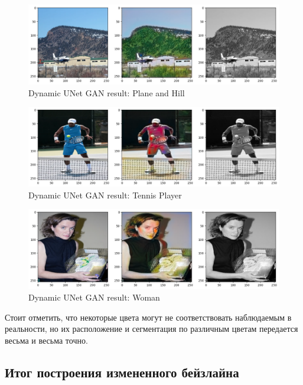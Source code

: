 \documentclass[14pt]{article}
\begin{document}
\begin{figure}[H]
    \centering
    \includegraphics[width=1.0\textwidth]{resources/dynamic_unet_gan_results/plane_and_hill.png}
    \caption{Dynamic UNet GAN result: Plane and Hill}
    \label{fig:plane_hill}
\end{figure}

\begin{figure}[H]
    \centering
    \includegraphics[width=1.0\textwidth]{resources/dynamic_unet_gan_results/tennis_player.png}
    \caption{Dynamic UNet GAN result: Tennis Player}
    \label{fig:tennis_player}
\end{figure}

\begin{figure}[H]
    \centering
    \includegraphics[width=1.0\textwidth]{resources/dynamic_unet_gan_results/woman.png}
    \caption{Dynamic UNet GAN result: Woman}
    \label{fig:woman}
\end{figure}

Стоит отметить, что некоторые цвета могут не соответствовать наблюдаемым в реальности,
но их расположение и сегментация по различным цветам передается весьма и весьма точно.

\subsection{Итог построения измененного бейзлайна}
\end{document}
